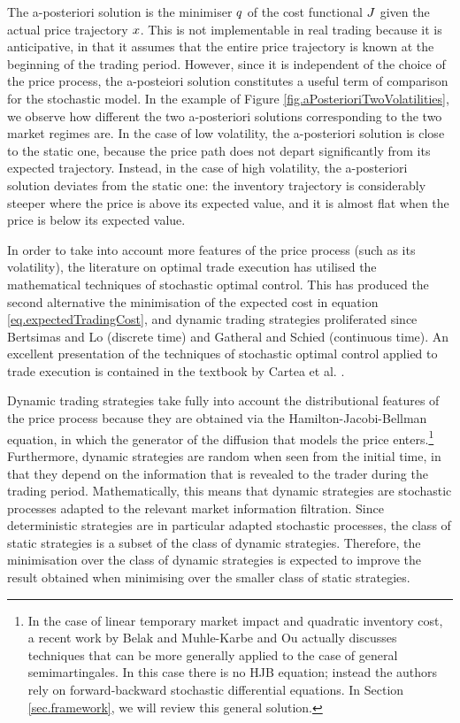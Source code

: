 \documentclass[10pt,a4paper]{article}
\begin{document}
	The a-posteriori solution  is the minimiser $q$ of the cost functional $J$ given the actual price trajectory $x$. This is not implementable in real trading because it is anticipative, in that it assumes that the entire price trajectory is known at the beginning of the trading period. However, since it is independent of the choice of the price process,  the a-posteiori solution constitutes a useful term of comparison for the stochastic model. In the example of Figure \ref{fig.aPosterioriTwoVolatilities}, we observe how different the two  a-posteriori solutions corresponding to the two market regimes are. In the case of low volatility, the a-posteriori solution is close to the static one, because the price path does not depart significantly from its expected trajectory. Instead, in the case of high volatility,  the a-posteriori solution deviates from the static one: the inventory trajectory is considerably steeper where the price is above its expected value, and it is almost flat when the price is below its expected value. 
	
	
	In order to take into account more features of the price process (such as its volatility), the literature on optimal trade execution has utilised the mathematical techniques of stochastic optimal control. This has produced the second alternative the minimisation of the expected cost in equation \eqref{eq.expectedTradingCost}, and dynamic trading strategies proliferated since Bertsimas and Lo \cite{BL98opt} (discrete time) and  Gatheral and Schied \cite{GS11opt} (continuous time). An excellent presentation of the techniques of stochastic optimal control applied to trade execution is contained in the textbook by  Cartea et al. \cite{CJP15alg}. 
	
	Dynamic trading strategies take fully into account the distributional features of the price process because they are obtained via the Hamilton-Jacobi-Bellman equation, in which the generator of the diffusion that models the price enters.\footnote{In the case of linear temporary market impact and quadratic inventory cost, a recent work by Belak and Muhle-Karbe and Ou \cite{BMO18opt} actually discusses techniques that can be more generally applied to the case of general semimartingales. In this case there is no HJB equation; instead the authors rely on forward-backward stochastic differential equations. In Section \ref{sec.framework}, we will review this general solution.}
	Furthermore, dynamic strategies are  random when seen from the initial time, in that they depend   on the information that is revealed to the trader during the trading period. Mathematically, this means that dynamic strategies are stochastic processes adapted to the relevant market information filtration.  Since deterministic strategies are in particular adapted stochastic processes, the class of static strategies is a subset of the class of dynamic strategies. Therefore, the minimisation  over the class of dynamic strategies is expected to improve the result obtained when minimising over the smaller class of  static strategies.  
	
\end{document}
